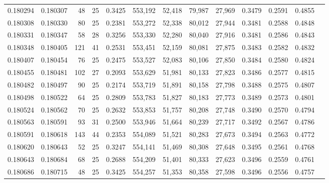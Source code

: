 \begin{tabular}{rrrrrrrrrrrrr}
0.180294 & 0.180307 &  48 &  25 &                                     0.3425 & 553,192 &  52,418 &  79,987 &  27,969 & 0.3479 & 0.2591 & 0.4855 \\
0.180308 & 0.180330 &  80 &  25 &                                     0.2381 & 553,272 &  52,338 &  80,012 &  27,944 & 0.3481 & 0.2588 & 0.4848 \\
0.180331 & 0.180347 &  58 &  28 &                                     0.3256 & 553,330 &  52,280 &  80,040 &  27,916 & 0.3481 & 0.2586 & 0.4843 \\
0.180348 & 0.180405 & 121 &  41 &                                     0.2531 & 553,451 &  52,159 &  80,081 &  27,875 & 0.3483 & 0.2582 & 0.4832 \\
0.180407 & 0.180454 &  76 &  25 &                                     0.2475 & 553,527 &  52,083 &  80,106 &  27,850 & 0.3484 & 0.2580 & 0.4824 \\
0.180455 & 0.180481 & 102 &  27 &                                     0.2093 & 553,629 &  51,981 &  80,133 &  27,823 & 0.3486 & 0.2577 & 0.4815 \\
0.180482 & 0.180497 &  90 &  25 &                                     0.2174 & 553,719 &  51,891 &  80,158 &  27,798 & 0.3488 & 0.2575 & 0.4807 \\
0.180498 & 0.180522 &  64 &  25 &                                     0.2809 & 553,783 &  51,827 &  80,183 &  27,773 & 0.3489 & 0.2573 & 0.4801 \\
0.180524 & 0.180562 &  70 &  25 &                                     0.2632 & 553,853 &  51,757 &  80,208 &  27,748 & 0.3490 & 0.2570 & 0.4794 \\
0.180563 & 0.180591 &  93 &  31 &                                     0.2500 & 553,946 &  51,664 &  80,239 &  27,717 & 0.3492 & 0.2567 & 0.4786 \\
0.180591 & 0.180618 & 143 &  44 &                                     0.2353 & 554,089 &  51,521 &  80,283 &  27,673 & 0.3494 & 0.2563 & 0.4772 \\
0.180620 & 0.180643 &  52 &  25 &                                     0.3247 & 554,141 &  51,469 &  80,308 &  27,648 & 0.3495 & 0.2561 & 0.4768 \\
0.180643 & 0.180684 &  68 &  25 &                                     0.2688 & 554,209 &  51,401 &  80,333 &  27,623 & 0.3496 & 0.2559 & 0.4761 \\
0.180686 & 0.180715 &  48 &  25 &                                     0.3425 & 554,257 &  51,353 &  80,358 &  27,598 & 0.3496 & 0.2556 & 0.4757 \\

\end{tabular}
